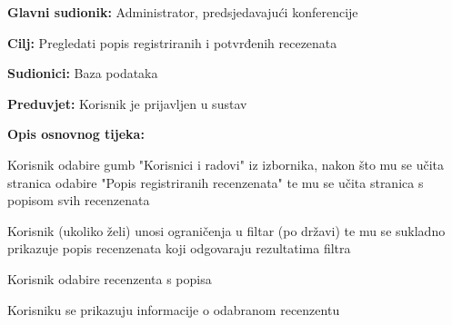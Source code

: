 					\noindent {}
					\begin{packed_item}
	
						\item \textbf{Glavni sudionik: } Administrator, predsjedavajući konferencije
						\item  \textbf{Cilj:} Pregledati popis registriranih i potvrđenih recezenata
						\item  \textbf{Sudionici:} Baza podataka
						\item  \textbf{Preduvjet:} Korisnik je prijavljen u sustav
						\item  \textbf{Opis osnovnog tijeka:}
						
						\item[] \begin{packed_enum}

							\item Korisnik odabire gumb "Korisnici i radovi" iz izbornika, nakon što mu se učita stranica odabire "Popis registriranih recenzenata" te mu se učita stranica s popisom svih recenzenata
							\item Korisnik (ukoliko želi) unosi ograničenja u filtar (po državi) te mu se sukladno prikazuje popis recenzenata koji odgovaraju rezultatima filtra
							\item Korisnik odabire recenzenta s popisa
							\item Korisniku se prikazuju informacije o odabranom recenzentu

					
						\end{packed_enum}
			
					\end{packed_item}

